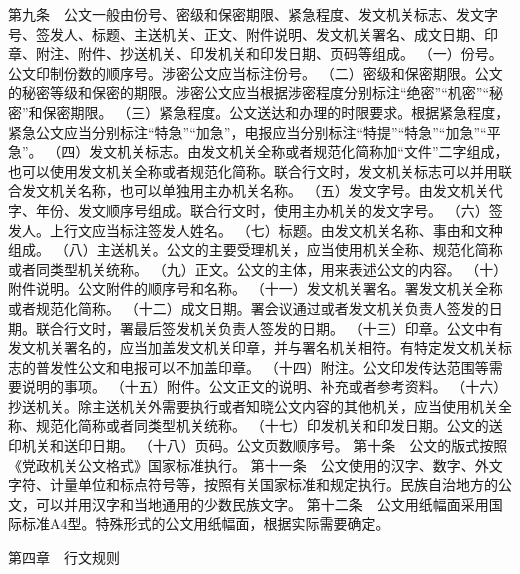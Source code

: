 \documentclass{gbt9704}
\begin{document}
第九条　公文一般由份号、密级和保密期限、紧急程度、发文机关标志、发文字号、签发人、标题、主送机关、正文、附件说明、发文机关署名、成文日期、印章、附注、附件、抄送机关、印发机关和印发日期、页码等组成。
（一）份号。公文印制份数的顺序号。涉密公文应当标注份号。
（二）密级和保密期限。公文的秘密等级和保密的期限。涉密公文应当根据涉密程度分别标注“绝密”“机密”“秘密”和保密期限。
（三）紧急程度。公文送达和办理的时限要求。根据紧急程度，紧急公文应当分别标注“特急”“加急”，电报应当分别标注“特提”“特急”“加急”“平急”。
（四）发文机关标志。由发文机关全称或者规范化简称加“文件”二字组成，也可以使用发文机关全称或者规范化简称。联合行文时，发文机关标志可以并用联合发文机关名称，也可以单独用主办机关名称。
（五）发文字号。由发文机关代字、年份、发文顺序号组成。联合行文时，使用主办机关的发文字号。
（六）签发人。上行文应当标注签发人姓名。
（七）标题。由发文机关名称、事由和文种组成。
（八）主送机关。公文的主要受理机关，应当使用机关全称、规范化简称或者同类型机关统称。
（九）正文。公文的主体，用来表述公文的内容。
（十）附件说明。公文附件的顺序号和名称。
（十一）发文机关署名。署发文机关全称或者规范化简称。
（十二）成文日期。署会议通过或者发文机关负责人签发的日期。联合行文时，署最后签发机关负责人签发的日期。
（十三）印章。公文中有发文机关署名的，应当加盖发文机关印章，并与署名机关相符。有特定发文机关标志的普发性公文和电报可以不加盖印章。
（十四）附注。公文印发传达范围等需要说明的事项。
（十五）附件。公文正文的说明、补充或者参考资料。
（十六）抄送机关。除主送机关外需要执行或者知晓公文内容的其他机关，应当使用机关全称、规范化简称或者同类型机关统称。
（十七）印发机关和印发日期。公文的送印机关和送印日期。
（十八）页码。公文页数顺序号。
第十条　公文的版式按照《党政机关公文格式》国家标准执行。
第十一条　公文使用的汉字、数字、外文字符、计量单位和标点符号等，按照有关国家标准和规定执行。民族自治地方的公文，可以并用汉字和当地通用的少数民族文字。
第十二条　公文用纸幅面采用国际标准A4型。特殊形式的公文用纸幅面，根据实际需要确定。

第四章　行文规则
\end{document}
